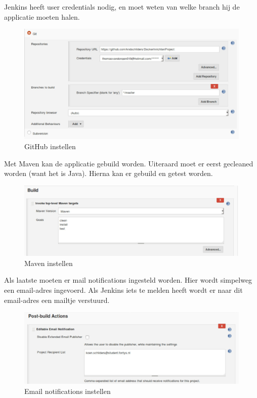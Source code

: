 \documentclass[12pt]{article}
\begin{document}
\noindent Jenkins heeft user credentials nodig, en moet weten van welke branch hij de applicatie moeten halen.

\begin{figure}[H]
	\begin{center}
		\includegraphics[width=1.0\textwidth]{images/Jenkins-Github-2.PNG}
		\caption{GitHub instellen\label{fig:jenkins_config_repo_2}}
	\end{center}
\end{figure}

\noindent Met Maven kan de applicatie gebuild worden. Uiteraard moet er eerst gecleaned worden (want het is Java). Hierna kan er gebuild en getest worden.

\begin{figure}[H]
	\begin{center}
		\includegraphics[width=1.0\textwidth]{images/Maven.PNG}
		\caption{Maven instellen\label{fig:jenkins_maven}}
	\end{center}
\end{figure}

\noindent Als laatste moeten er mail notifications ingesteld worden. Hier wordt simpelweg een email-adres ingevoerd. Als Jenkins iets te melden heeft wordt er naar dit email-adres een mailtje verstuurd.

\begin{figure}[H]
	\begin{center}
		\includegraphics[width=1.0\textwidth]{images/Postbuildaction.PNG}
		\caption{Email notifications instellen\label{fig:jenkins_config_email_notifications}}
	\end{center}
\end{figure}
\end{document}
